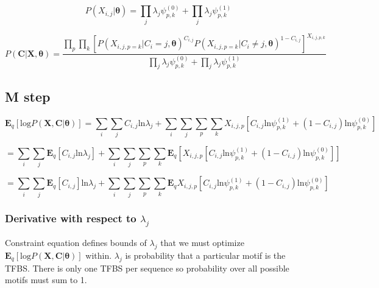 \documentclass[12pt]{article}
\theoremstyle{definition}
\begin{document}
\begin{equation}
	P(X_{i,j} | \boldsymbol{\theta}) = \prod_{j} \lambda_{j} \psi_{p, k}^{(0)} + \prod_{j} \lambda_{j} \psi_{p, k}^{(1)}
\end{equation}
 

\begin{equation}
P(\boldsymbol{C} | \boldsymbol{X}, \boldsymbol{\theta}) = \frac{\prod_{p}\prod_{k}[P(X_{i,j,p=k} | C_{i}=j, \boldsymbol{\theta})^{C_{i,j}}P(X_{i,j,p=k} | C_{i}\neq j, \boldsymbol{\theta})^{1-C_{i,j}}]^{X_{i,j,p,k}}}{\prod_{j} \lambda_{j} \psi_{p, k}^{(0)} + \prod_{j} \lambda_{j} \psi_{p, k}^{(1)}}
\end{equation}

\subsection{M step}

\begin{equation}
	\boldsymbol{E}_{q}[\textrm{log} P(\boldsymbol{X}, \boldsymbol{C} | \boldsymbol{\theta})] =  \sum_{i} \sum_{j} C_{i, j} \textrm{ln}\lambda_{j} + \sum_{i}\sum_{j}\sum_{p}\sum_{k} X_{i,j,p}[C_{i,j}\textrm{ln} \psi^{(1)}_{p, k} + (1 - C_{i,j})\textrm{ln}\psi^{(0)}_{p, k}]
\end{equation}

\begin{equation}
=  \sum_{i} \sum_{j} \boldsymbol{E}_{q} [C_{i, j} \textrm{ln}\lambda_{j}] + \sum_{i}\sum_{j}\sum_{p}\sum_{k} 	\boldsymbol{E}_{q}[X_{i,j,p}[C_{i,j}\textrm{ln} \psi^{(1)}_{p, k} + (1 - C_{i,j})\textrm{ln}\psi^{(0)}_{p, k}]]
\end{equation}

\begin{equation}
=  \sum_{i} \sum_{j} \boldsymbol{E}_{q}[C_{i, j}] \textrm{ln}\lambda_{j} + \sum_{i}\sum_{j}\sum_{p}\sum_{k} 	\boldsymbol{E}_{q}X_{i,j,p}[C_{i,j}\textrm{ln} \psi^{(1)}_{p, k} + (1 - C_{i,j})\textrm{ln}\psi^{(0)}_{p, k}]
\end{equation}

\subsubsection{Derivative with respect to $\lambda_{j}$}

Constraint equation defines bounds of $\lambda_{j}$ that we must optimize $\boldsymbol{E}_{q}[\textrm{log} P(\boldsymbol{X}, \boldsymbol{C} | \boldsymbol{\theta})]$ within. $\lambda_{j}$ is probability that a particular motif is the TFBS. There is only one TFBS per sequence so probability over all possible motifs must sum to 1.
\end{document}
